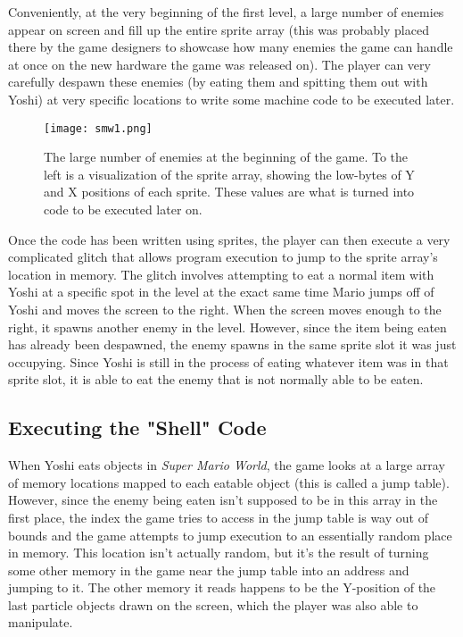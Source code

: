 Conveniently, at the very beginning of the first level, a large number of enemies appear on screen and fill up the entire sprite array (this was probably placed there by the game designers to showcase how many enemies the game can handle at once on the new hardware the game was released on). The player can very carefully despawn these enemies (by eating them and spitting them out with Yoshi) at very specific locations to write some machine code to be executed later.

\begin{figure}
\texttt{[image: smw1.png]}
\caption{The large number of enemies at the beginning of the game. To the left is a visualization of the sprite array, showing the low-bytes of Y and X positions of each sprite. These values are what is turned into code to be executed later on. \cite{dotsarecool_2015}}
\end{figure}

Once the code has been written using sprites, the player can then execute a very complicated glitch that allows program execution to jump to the sprite array's location in memory. The glitch involves attempting to eat a normal item with Yoshi at a specific spot in the level at the exact same time Mario jumps off of Yoshi and moves the screen to the right. When the screen moves enough to the right, it spawns another enemy in the level. However, since the item being eaten has already been despawned, the enemy spawns in the same sprite slot it was just occupying. Since Yoshi is still in the process of eating whatever item was in that sprite slot, it is able to eat the enemy that is not normally able to be eaten.

\subsection{Executing the "Shell" Code}

When Yoshi eats objects in \textit{Super Mario World}, the game looks at a large array of memory locations mapped to each eatable object (this is called a jump table). However, since the enemy being eaten isn't supposed to be in this array in the first place, the index the game tries to access in the jump table is way out of bounds and the game attempts to jump execution to an essentially random place in memory. This location isn't actually random, but it's the result of turning some other memory in the game near the jump table into an address and jumping to it. The other memory it reads happens to be the Y-position of the last particle objects drawn on the screen, which the player was also able to manipulate.


